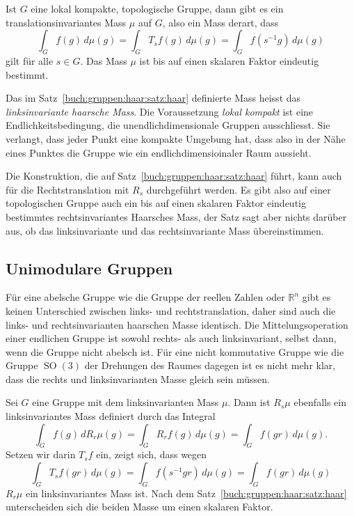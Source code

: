 \begin{satz}[Haar]
\label{buch:gruppen:haar:satz:haar}
Ist $G$ eine lokal kompakte, topologische Gruppe, dann gibt es ein
translationsinvariantes Mass $\mu$ auf $G$, also ein Mass derart,
dass 
\[
\int_G f(g)\,d\mu(g)
=
\int_G T_sf(g)\,d\mu(g)
=
\int_G f(s^{-1}g)\,d\mu(g)
\]
gilt für alle $s\in G$.
Das Mass $\mu$ ist bis auf einen skalaren Faktor eindeutig bestimmt.
\end{satz}

Das im Satz~\ref{buch:gruppen:haar:satz:haar} definierte Mass
heisst das {\em linksinvariante haarsche Mass}.
Die Voraussetzung {\em lokal kompakt} ist eine Endlichkeitsbedingung,
die unendlichdimensionale Gruppen ausschliesst.
Sie verlangt, dass jeder Punkt eine kompakte Umgebung hat, dass also
in der Nähe eines Punktes die Gruppe wie ein endlichdimensioinaler 
Raum aussieht.

Die Konstruktion, die auf Satz~\ref{buch:gruppen:haar:satz:haar}
führt, kann auch für die Rechtstranslation mit $R_s$ durchgeführt
werden.
Es gibt also auf einer topologischen Gruppe auch ein bis auf einen
skalaren Faktor eindeutig bestimmtes rechtsinvariantes Haarsches Mass,
der Satz sagt aber nichts darüber aus, ob das linksinvariante und das
rechtsinvariante Mass übereinstimmen.

%
%
\subsection{Unimodulare Gruppen
\label{buch:haar:subsection:unimodular}}
Für eine abelsche Gruppe wie die Gruppe der reellen Zahlen
oder $\mathbb{R}^n$ gibt es keinen Unterschied zwischen links- und
rechtstranslation, daher sind auch die links- und rechtsinvarianten
haarschen Masse identisch.
Die Mittelungsoperation einer endlichen Gruppe ist sowohl rechts-
als auch linksinvariant, selbst dann, wenn die Gruppe nicht abelsch
ist.
Für eine nicht kommutative Gruppe wie die Gruppe $\operatorname{SO}(3)$
der Drehungen des Raumes dagegen ist es nicht mehr klar, dass 
die rechts und linksinvarianten Masse gleich sein müssen.

Sei $G$ eine Gruppe mit dem linksinvarianten Mass $\mu$.
Dann ist $R_s\mu$ ebenfalls ein linksinvariantes Mass definiert
durch das Integral
\[
\int_G f(g) \, dR_r\mu(g)
=
\int_G R_rf(g) \,d\mu(g)
=
\int_G f(gr)\,d\mu(g).
\]
Setzen wir darin $T_sf$ ein, zeigt sich, dass wegen
\[
\int_G T_sf(gr)\,d\mu(g)
=
\int_G f(s^{-1}gr)\,d\mu(g)
=
\int_G f(gr)\,d\mu(g)
\]
$R_r\mu$ ein linksinvariantes Mass ist.
Nach dem Satz~\ref{buch:gruppen:haar:satz:haar} unterscheiden sich
die beiden Masse um einen skalaren Faktor.

